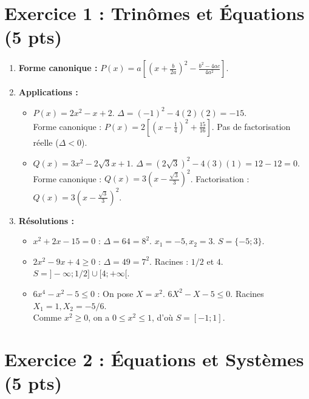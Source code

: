 \documentclass[12pt,a4paper]{article}
\begin{document}
\section*{\color{red} Exercice 1 : Trinômes et Équations (5 pts)}

\begin{enumerate}
    \item \textbf{Forme canonique :} $P(x) = a\left[ \left(x + \frac{b}{2a}\right)^2 - \frac{b^2 - 4ac}{4a^2} \right]$.
    
    \item \textbf{Applications :}
    \begin{itemize}
        \item $P(x)= 2x^2-x+2$. $\Delta = (-1)^2 - 4(2)(2) = -15$. \\
        Forme canonique : $P(x) = 2\left[ \left(x - \frac{1}{4}\right)^2 + \frac{15}{16} \right]$. Pas de factorisation réelle ($\Delta < 0$).
        \item $Q(x)= 3x^2-2\sqrt{3}x+1$. $\Delta = (2\sqrt{3})^2 - 4(3)(1) = 12 - 12 = 0$. \\
        Forme canonique : $Q(x) = 3\left(x - \frac{\sqrt{3}}{3}\right)^2$. Factorisation : $Q(x) = 3\left(x - \frac{\sqrt{3}}{3}\right)^2$.
    \end{itemize}

    \item \textbf{Résolutions :}
    \begin{itemize}
        \item $x^2 + 2x - 15 = 0$ : $\Delta = 64 = 8^2$. $x_1 = -5, x_2 = 3$. \textbf{$S = \{-5 ; 3\}$}.
        \item $2x^2 - 9x + 4 \geq 0$ : $\Delta = 49 = 7^2$. Racines : $1/2$ et $4$. \textbf{$S = ]-\infty ; 1/2] \cup [4 ; +\infty[$}.
        \item $6x^4 - x^2 - 5 \leq 0$ : On pose $X = x^2$. $6X^2 - X - 5 \leq 0$. Racines $X_1 = 1, X_2 = -5/6$. \\
        Comme $x^2 \geq 0$, on a $0 \leq x^2 \leq 1$, d'où \textbf{$S = [-1 ; 1]$}.
    \end{itemize}
\end{enumerate}

\section*{\color{red} Exercice 2 : Équations et Systèmes (5 pts)}
\end{document}
